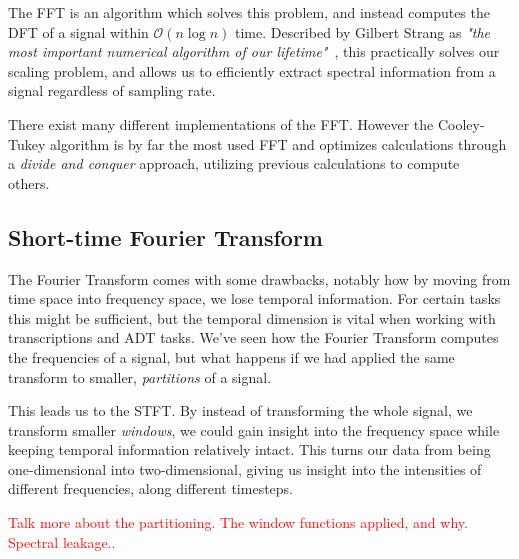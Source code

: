 The \gls{FFT} is an algorithm which solves this problem, and instead computes the \gls{DFT} of a signal within $\mathcal{O}(n\log{n})$ time. Described by Gilbert Strang as \textit{"the most important numerical algorithm of our lifetime"}~\cite{strang1993wavelettransformsversusfourier}, this practically solves our scaling problem, and allows us to efficiently extract spectral information from a signal regardless of sampling rate.

There exist many different implementations of the \gls{FFT}. However the Cooley-Tukey algorithm is by far the most used \gls{FFT} and optimizes calculations through a \textit{divide and conquer} approach, utilizing previous calculations to compute others.~\cite{d3ea2d52-5ab2-3128-8b80-efb85267295d}

\subsection{Short-time Fourier Transform}

The Fourier Transform comes with some drawbacks, notably how by moving from time space into frequency space, we lose temporal information. For certain tasks this might be sufficient, but the temporal dimension is vital when working with transcriptions and \gls{ADT} tasks. We've seen how the Fourier Transform computes the frequencies of a signal, but what happens if we had applied the same transform to smaller, \textit{partitions} of a signal.

This leads us to the \gls{STFT}. By instead of transforming the whole signal, we transform smaller \textit{windows}, we could gain insight into the frequency space while keeping temporal information relatively intact. This turns our data from being one-dimensional into two-dimensional, giving us insight into the intensities of different frequencies, along different timesteps.

\textcolor{red}{Talk more about the partitioning. The window functions applied, and why. Spectral leakage..}

